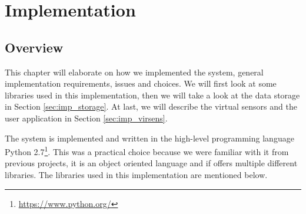 \documentclass[USenglish]{uit-thesis}
\begin{document}

\chapter{Implementation}
\section{Overview}
This chapter will elaborate on how we implemented the system, general implementation requirements, issues and choices. 
We will first look at some libraries used in this implementation, then we will take a look at the data storage in Section \ref{sec:imp_storage}. At last, we will describe the virtual sensors and the user application in Section \ref{sec:imp_virsens}.

The system is implemented and written in the high-level programming language Python 2.7\footnote{\url{https://www.python.org/}}. This was a practical choice because we were familiar with it from previous projects, it is an object oriented language and if offers multiple different libraries. The libraries used in this implementation are mentioned below.
\end{document}

